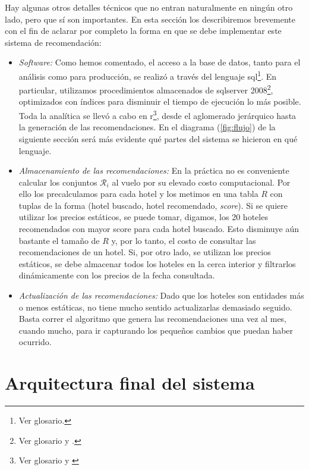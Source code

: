 \documentclass[12pt]{report}
\newcommand{\RR}{\mathcal{R}}
\begin{document}
Hay algunas otros detalles técnicos que no entran naturalmente en ningún otro lado, pero que sí son importantes. En esta sección los describiremos brevemente con el fin de aclarar por completo la forma en que se debe implementar este sistema de recomendación:
\begin{itemize}
	\item \emph{Software:} Como hemos comentado, el acceso a la base de datos, tanto para el análisis como para producción, se realizó a través del lenguaje \gls{sql}\footnote{Ver glosario.}. En particular, utilizamos procedimientos almacenados de \gls{sqlserver} 2008\footnote{Ver glosario y \cite{sql}.}, optimizados con índices para disminuir el tiempo de ejecución lo más posible. Toda la analítica se llevó a cabo en \gls{r}\footnote{Ver glosario y \cite{R}}, desde el aglomerado jerárquico hasta la generación de las recomendaciones. En el diagrama (\ref{fig:flujo}) de la siguiente sección será más evidente qué partes del sistema se hicieron en qué lenguaje.
	\item \emph{Almacenamiento de las recomendaciones:} En la práctica no es conveniente calcular los conjuntos $\RR_i$ al vuelo por su elevado costo computacional. Por ello los precalculamos para cada hotel y los metimos en una tabla $R$ con tuplas de la forma (hotel buscado, hotel recomendado, \emph{score}). Si se quiere utilizar los precios estáticos, se puede tomar, digamos, los 20 hoteles recomendados con mayor score para cada hotel buscado. Esto disminuye aún bastante el tamaño de $R$ y, por lo tanto, el costo de consultar las recomendaciones de un hotel. Si, por otro lado, se utilizan los precios estáticos, se debe almacenar todos los hoteles en la cerca interior y filtrarlos dinámicamente con los precios de la fecha consultada.
	\item \emph{Actualización de las recomendaciones:} Dado que los hoteles son entidades más o menos estáticas, no tiene mucho sentido actualizarlas demasiado seguido. Basta correr el algoritmo que genera las recomendaciones una vez al mes, cuando mucho, para ir capturando los pequeños cambios que puedan haber ocurrido.
\end{itemize}


\section{Arquitectura final del sistema} \label{sec:arqui}
\end{document}
